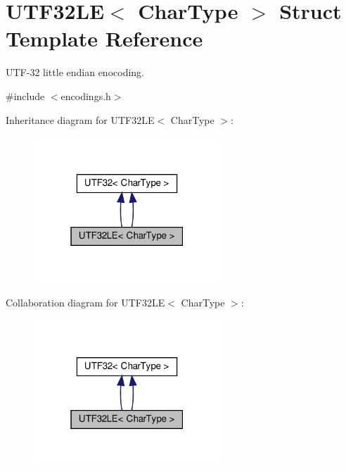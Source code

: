\hypertarget{structUTF32LE}{}\section{U\+T\+F32\+LE$<$ Char\+Type $>$ Struct Template Reference}
\label{structUTF32LE}


U\+T\+F-\/32 little endian enocoding.  




{\ttfamily \#include $<$encodings.\+h$>$}



Inheritance diagram for U\+T\+F32\+LE$<$ Char\+Type $>$\+:
\nopagebreak
\begin{figure}[H]
\begin{center}
\leavevmode
\includegraphics[width=199pt]{structUTF32LE__inherit__graph}
\end{center}
\end{figure}


Collaboration diagram for U\+T\+F32\+LE$<$ Char\+Type $>$\+:
\nopagebreak
\begin{figure}[H]
\begin{center}
\leavevmode
\includegraphics[width=199pt]{structUTF32LE__coll__graph}
\end{center}
\end{figure}
